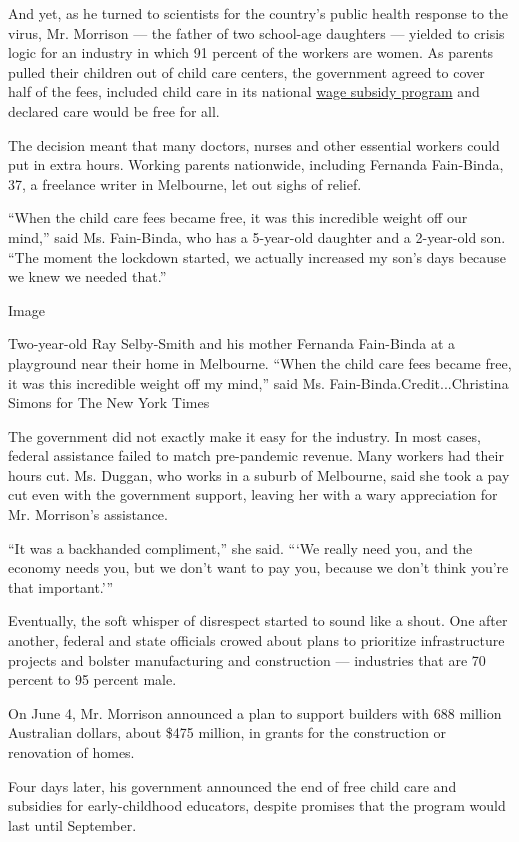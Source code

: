 And yet, as he turned to scientists for the country's public health
response to the virus, Mr. Morrison --- the father of two school-age
daughters --- yielded to crisis logic for an industry in which 91
percent of the workers are women. As parents pulled their children out
of child care centers, the government agreed to cover half of the fees,
included child care in its national
\href{https://www.ato.gov.au/general/jobkeeper-payment/}{wage subsidy
program} and declared care would be free for all.

The decision meant that many doctors, nurses and other essential workers
could put in extra hours. Working parents nationwide, including Fernanda
Fain-Binda, 37, a freelance writer in Melbourne, let out sighs of
relief.

``When the child care fees became free, it was this incredible weight
off our mind,'' said Ms. Fain-Binda, who has a 5-year-old daughter and a
2-year-old son. ``The moment the lockdown started, we actually increased
my son's days because we knew we needed that.''

Image

Two-year-old Ray Selby-Smith and his mother Fernanda Fain-Binda at a
playground near their home in Melbourne. ``When the child care fees
became free, it was this incredible weight off my mind,'' said Ms.
Fain-Binda.Credit...Christina Simons for The New York Times

The government did not exactly make it easy for the industry. In most
cases, federal assistance failed to match pre-pandemic revenue. Many
workers had their hours cut. Ms. Duggan, who works in a suburb of
Melbourne, said she took a pay cut even with the government support,
leaving her with a wary appreciation for Mr. Morrison's assistance.

``It was a backhanded compliment,'' she said. ```We really need you, and
the economy needs you, but we don't want to pay you, because we don't
think you're that important.'''

Eventually, the soft whisper of disrespect started to sound like a
shout. One after another, federal and state officials crowed about plans
to prioritize infrastructure projects and bolster manufacturing and
construction --- industries that are 70 percent to 95 percent male.

On June 4, Mr. Morrison announced a plan to support builders with 688
million Australian dollars, about \$475 million, in grants for the
construction or renovation of homes.

Four days later, his government announced the end of free child care and
subsidies for early-childhood educators, despite promises that the
program would last until September.

